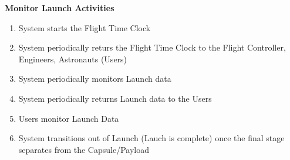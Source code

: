 \documentclass[letterpaper]{article}
\begin{document}
\noindent
\textbf{Monitor Launch Activities}
\begin{enumerate}
\item System starts the Flight Time Clock
\item System periodically returs the Flight Time Clock to the
Flight Controller, Engineers, Astronauts (Users)
\item System periodically monitors Launch data
\item System periodically returns Launch data to the Users
\item Users monitor Launch Data
\item System transitions out of Launch (Lauch is complete) once the
final stage separates from the Capsule/Payload
\end{enumerate}
\end{document}
